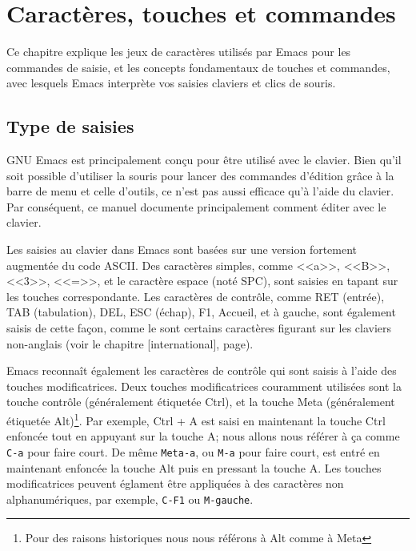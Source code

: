 \chapter{Caractères, touches et commandes}
Ce chapitre explique les jeux de caractères utilisés par Emacs pour
les commandes de saisie, et les concepts fondamentaux de touches et
commandes, avec lesquels Emacs interprète vos saisies claviers et
clics de souris.\par

\section{Type de saisies}
GNU Emacs est principalement conçu pour être utilisé avec le
clavier. Bien qu'il soit possible d'utiliser la souris pour lancer des
commandes d'édition grâce à la barre de menu et celle d'outils, ce
n'est pas aussi efficace qu'à l'aide du clavier. Par conséquent, ce
manuel documente principalement comment éditer avec le clavier.\par

Les saisies au clavier dans Emacs sont basées sur une version
fortement augmentée du code ASCII. Des caractères simples, comme
<<a>>, <<B>>, <<3>>, <<=>>, et le caractère espace (noté SPC), sont
saisies en tapant sur les touches correspondante. Les caractères de
contrôle, comme RET (entrée), TAB (tabulation), DEL, ESC (échap), F1,
Accueil, et à gauche, sont également saisis de cette façon, comme le
sont certains caractères figurant sur les claviers non-anglais (voir
le chapitre [international], page).\par 

Emacs reconnaît également les caractères de contrôle qui sont saisis à
l'aide des touches modificatrices. Deux touches modificatrices
couramment utilisées sont la touche contrôle (généralement étiquetée
Ctrl), et la touche Meta (généralement étiquetée Alt)\footnote{Pour
  des raisons historiques nous nous référons à Alt comme à Meta}. Par
exemple, Ctrl + A est saisi en maintenant la touche Ctrl enfoncée tout
en appuyant sur la touche A; nous allons nous référer à ça comme
\texttt{C-a} pour faire court. De même \texttt{Meta-a}, ou
\texttt{M-a} pour faire court, est entré en maintenant enfoncée la
touche Alt puis en pressant la touche A. Les touches modificatrices
peuvent églament être appliquées à des caractères non alphanumériques,
par exemple, \texttt{C-F1} ou \texttt{M-gauche}.\par 

